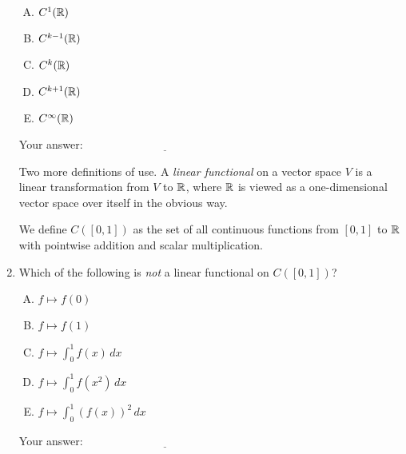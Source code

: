 \documentclass[10pt]{amsart}
\begin{document}
\begin{enumerate}
  \begin{enumerate}[(A)]
  \item $C^1(\mathbb{R})$
  \item $C^{k-1}(\mathbb{R})$
  \item $C^k(\mathbb{R})$
  \item $C^{k+1}(\mathbb{R})$
  \item $C^\infty(\mathbb{R})$
  \end{enumerate}

  \vspace{0.1in}
  Your answer: $\underline{\qquad\qquad\qquad\qquad\qquad\qquad\qquad}$
  \vspace{0.1in}

  Two more definitions of use. A {\em linear functional} on a vector
  space $V$ is a linear transformation from $V$ to $\mathbb{R}$, where $\mathbb{R}$ is
  viewed as a one-dimensional vector space over itself in the obvious way.

  We define $C([0,1])$ as the set of all continuous functions from
  $[0,1]$ to $\mathbb{R}$ with pointwise addition and scalar multiplication.

\item Which of the following is {\em not} a linear functional on
  $C([0,1])$?

  \begin{enumerate}[(A)]
  \item $f \mapsto f(0)$
  \item $f \mapsto f(1)$
  \item $f \mapsto \int_0^1 f(x) \, dx$
  \item $f \mapsto \int_0^1 f(x^2) \, dx$
  \item $f \mapsto \int_0^1 (f(x))^2 \, dx$
  \end{enumerate}

   \vspace{0.1in}
   Your answer: $\underline{\qquad\qquad\qquad\qquad\qquad\qquad\qquad}$
   \vspace{0.1in}


\end{enumerate}
\end{document}
